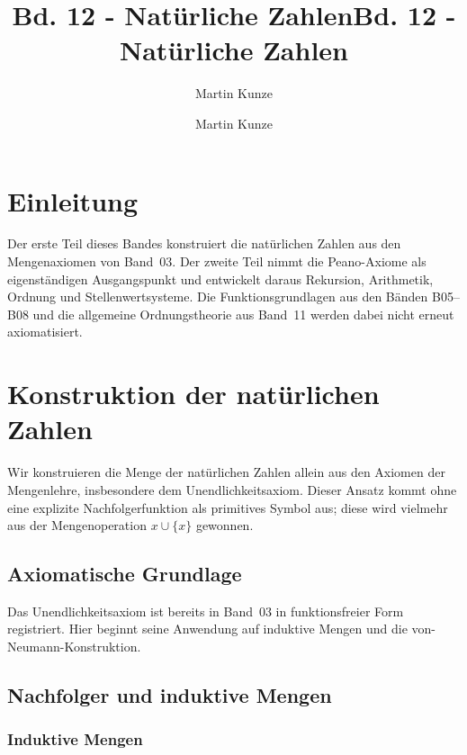 \documentclass[main.tex]{subfiles}
\title{Bd. 12 - Natürliche Zahlen}
\author{Martin Kunze}
\date{}
\begin{document}
\title{Bd. 12 - Natürliche Zahlen}
\author{Martin Kunze}
\date{}
\hypersetup{pageanchor=false}
\maketitle
\hypersetup{pageanchor=true}
\setcounter{tocdepth}{3}
\tableofcontents
\setcounter{file}{12}
\renewcommand{\FormulaBandID}{12}

\chapter{Einleitung}

Der erste Teil dieses Bandes konstruiert die natürlichen Zahlen aus den
Mengenaxiomen von Band~03. Der zweite Teil nimmt die Peano-Axiome als
eigenständigen Ausgangspunkt und entwickelt daraus Rekursion, Arithmetik,
Ordnung und Stellenwertsysteme. Die Funktionsgrundlagen aus den Bänden
B05--B08 und die allgemeine Ordnungstheorie aus Band~11 werden dabei nicht
erneut axiomatisiert.

\chapter{Konstruktion der natürlichen Zahlen}

Wir konstruieren die Menge der natürlichen Zahlen allein aus den Axiomen der Mengenlehre, insbesondere dem Unendlichkeitsaxiom.  Dieser Ansatz kommt ohne eine explizite Nachfolgerfunktion als primitives Symbol aus; diese wird vielmehr aus der Mengenoperation \(x \cup \{x\}\) gewonnen.


\section{Axiomatische Grundlage}

Das Unendlichkeitsaxiom ist bereits in Band~03 in funktionsfreier Form
registriert. Hier beginnt seine Anwendung auf induktive Mengen und die
von-Neumann-Konstruktion.

\section{Nachfolger und induktive Mengen}

\subsection{Induktive Mengen}

\end{document}
